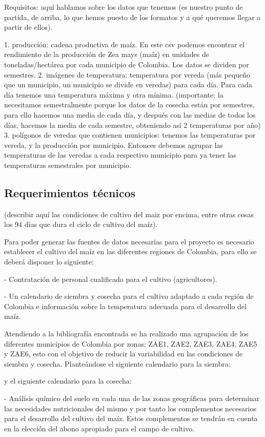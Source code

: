 \documentclass[12pt, spanish]{article}
\begin{document}
Requisitos: aquí hablamos sobre los datos que tenemos (es nuestro punto de partida, de arriba, lo que hemos puesto de los formatos y a qué queremos llegar a partir de ellos).

1. producción: cadena productiva de maíz. En este csv podemos encontrar el rendimiento de la producción de Zea mays (maíz) en unidades de toneladas/hectárea por cada municipio de Colombia. Los datos se dividen por semestres.
2. imágenes de temperatura: temperatura por vereda (más pequeño que un municipio, un municipio se divide en veredas) para cada día. Para cada día tenemos una temperatura máxima y otra mínima. (importante: la necesitamos semestralmente porque los datos de la cosecha están por semestres, para ello hacemos una media de cada día, y después con las medias de todos los días, hacemos la media de cada semestre, obteniendo así 2 temperaturas por año)
3. polígonos de veredas que contienen municipios: tenemos las temperaturas por vereda, y la producción por municipio. Entonces debemos agrupar las temperaturas de las veredas a cada respectivo municipio para ya tener las temperaturas semestrales por municipio.

\subsection{Requerimientos técnicos}

(describir aquí las condiciones de cultivo del maiz por encima, entre otras cosas los 94 días que dura el ciclo de cultivo del maíz).

Para poder generar las fuentes de datos necesarias para el proyecto es necesario establecer el cultivo del maíz en las diferentes regiones de Colombia, para ello se deberá disponer lo siguiente:

- Contratación de personal cualificado para el cultivo (agricultores).

- Un calendario de siembra y cosecha para el cultivo adaptado a cada región de Colombia e información sobre la temperatura adecuada para el desarrollo del maíz.

Atendiendo a la bibliografía encontrada se ha realizado una agrupación de los diferentes municipios de Colombia por zonas: 
ZAE1, ZAE2, ZAE3, ZAE4, ZAE5  y ZAE6, esto con el objetivo de reducir la variabilidad en las condiciones de siembra y cosecha. Planteándose el siguiente calendario para la siembra:

y el siguiente calendario para la cosecha: 

- Análisis químico del suelo en cada una de las zonas geográficas para determinar las necesidades nutricionales del mismo y por tanto los complementos necesarios para el desarrollo del cultivo del maíz. Estos complementos se tendrán en cuenta en la elección del abono apropiado para el campo de cultivo.
\end{document}
